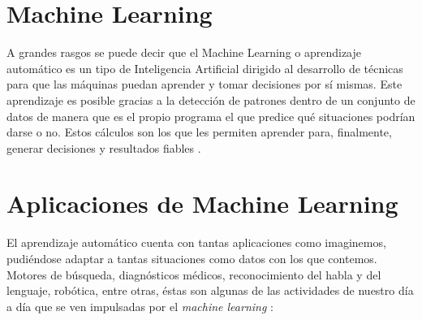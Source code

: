 \section{Machine Learning}
A grandes rasgos se puede decir que el Machine Learning o aprendizaje
automático es un tipo de Inteligencia Artificial dirigido al desarrollo de técnicas para que
las máquinas puedan aprender y tomar decisiones por sí mismas.
Este aprendizaje es posible gracias a la detección de patrones dentro de un
conjunto de datos de manera que es el propio programa el que predice qué situaciones
podrían darse o no. Estos cálculos son los que les permiten aprender para, finalmente,
generar decisiones y resultados fiables \cite{31MLApplications}.

\section{Aplicaciones de Machine Learning}
El aprendizaje automático cuenta con tantas aplicaciones como imaginemos,
pudiéndose adaptar a tantas situaciones como datos con los que contemos. Motores de
búsqueda, diagnósticos médicos, reconocimiento del habla y del lenguaje, robótica, entre
otras, éstas son algunas de las actividades de nuestro día a día que se ven impulsadas por
el \textit{machine learning} \cite{31MLApplications}:


